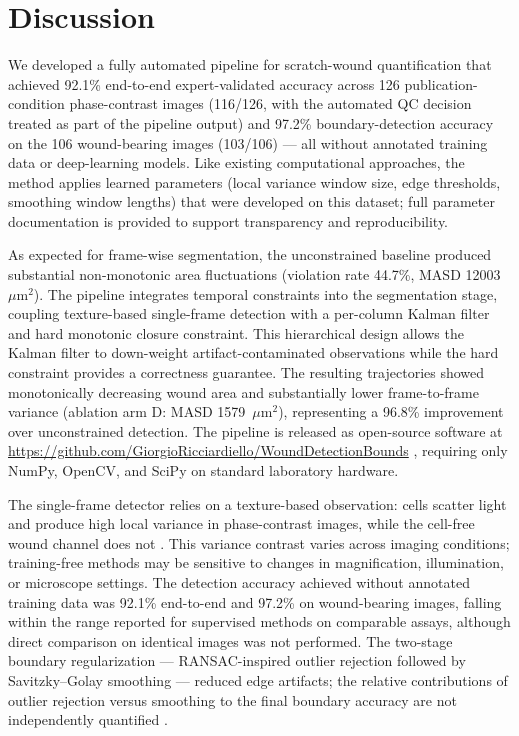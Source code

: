 \section{Discussion}

We developed a fully automated pipeline for scratch-wound quantification that achieved 92.1\% end-to-end expert-validated accuracy across 126 publication-condition phase-contrast images (116/126, with the automated QC decision treated as part of the pipeline output) and 97.2\% boundary-detection accuracy on the 106 wound-bearing images (103/106) --- all without annotated training data or deep-learning models. Like existing computational approaches, the method applies learned parameters (local variance window size, edge thresholds, smoothing window lengths) that were developed on this dataset; full parameter documentation is provided to support transparency and reproducibility.

As expected for frame-wise segmentation, the unconstrained baseline produced substantial non-monotonic area fluctuations (violation rate 44.7\%, MASD 12003~$\mu$m$^2$). The pipeline integrates temporal constraints into the segmentation stage, coupling texture-based single-frame detection with a per-column Kalman filter and hard monotonic closure constraint. This hierarchical design allows the Kalman filter to down-weight artifact-contaminated observations while the hard constraint provides a correctness guarantee. The resulting trajectories showed monotonically decreasing wound area and substantially lower frame-to-frame variance (ablation arm D: MASD 1579~$\mu$m$^2$), representing a 96.8\% improvement over unconstrained detection. The pipeline is released as open-source software at \url{https://github.com/GiorgioRicciardiello/WoundDetectionBounds} \citep{Ricciardiello2025code}, requiring only NumPy, OpenCV, and SciPy on standard laboratory hardware.

The single-frame detector relies on a texture-based observation: cells scatter light and produce high local variance in phase-contrast images, while the cell-free wound channel does not \citep{Yin2012}. This variance contrast varies across imaging conditions; training-free methods may be sensitive to changes in magnification, illumination, or microscope settings. The detection accuracy achieved without annotated training data was 92.1\% end-to-end and 97.2\% on wound-bearing images, falling within the range reported for supervised methods on comparable assays, although direct comparison on identical images was not performed. The two-stage boundary regularization — RANSAC-inspired outlier rejection followed by Savitzky--Golay smoothing — reduced edge artifacts; the relative contributions of outlier rejection versus smoothing to the final boundary accuracy are not independently quantified \citep{Fischler1981,Savitzky1964}.

